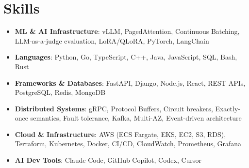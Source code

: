 \documentclass[letterpaper,11pt]{article}
\newcommand{\resumeSubHeadingListStart}{\begin{itemize}[leftmargin=0.15in, label={}]}
\newcommand{\resumeSubHeadingListEnd}{\end{itemize}}
\newcommand{\resumeSkillHeading}[2]{%
  \item\small{\textbf{#1}: #2 \vspace{-9pt}}%
}
\begin{document}
\section{Skills}
  \resumeSubHeadingListStart
    \resumeSkillHeading{ML \& AI Infrastructure}{vLLM, PagedAttention, Continuous Batching, LLM-as-a-judge evaluation, LoRA/QLoRA, PyTorch, LangChain}
    \resumeSkillHeading{Languages}{Python, Go, TypeScript, C++, Java, JavaScript, SQL, Bash, Rust}
    \resumeSkillHeading{Frameworks \& Databases}{FastAPI, Django, Node.js, React, REST APIs, PostgreSQL, Redis, MongoDB}
    \resumeSkillHeading{Distributed Systems}{gRPC, Protocol Buffers, Circuit breakers, Exactly-once semantics, Fault tolerance, Kafka, Multi-AZ, Event-driven architecture}
    \resumeSkillHeading{Cloud \& Infrastructure}{AWS (ECS Fargate, EKS, EC2, S3, RDS), Terraform, Kubernetes, Docker, CI/CD, CloudWatch, Prometheus, Grafana}
    \resumeSkillHeading{AI Dev Tools}{Claude Code, GitHub Copilot, Codex, Cursor}
  \resumeSubHeadingListEnd
\end{document}
